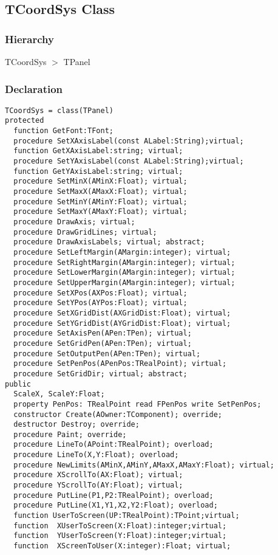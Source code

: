 \documentclass[12pt,a4paper,oneside]{report}
\begin{document}
\subsection{TCoordSys Class}\label{lmcoordsys.TCoordSys}
\subsubsection{Hierarchy}
TCoordSys {$>$} TPanel
\subsubsection{Declaration}
\begin{verbatim}
TCoordSys = class(TPanel)
protected
  function GetFont:TFont;
  procedure SetXAxisLabel(const ALabel:String);virtual;
  function GetXAxisLabel:string; virtual;
  procedure SetYAxisLabel(const ALabel:String);virtual;
  function GetYAxisLabel:string; virtual;
  procedure SetMinX(AMinX:Float); virtual;
  procedure SetMaxX(AMaxX:Float); virtual;
  procedure SetMinY(AMinY:Float); virtual;
  procedure SetMaxY(AMaxY:Float); virtual;
  procedure DrawAxis; virtual;
  procedure DrawGridLines; virtual;
  procedure DrawAxisLabels; virtual; abstract; 
  procedure SetLeftMargin(AMargin:integer); virtual;
  procedure SetRightMargin(AMargin:integer); virtual;
  procedure SetLowerMargin(AMargin:integer); virtual;
  procedure SetUpperMargin(AMargin:integer); virtual;
  procedure SetXPos(AXPos:Float); virtual;
  procedure SetYPos(AYPos:Float); virtual;
  procedure SetXGridDist(AXGridDist:Float); virtual;
  procedure SetYGridDist(AYGridDist:Float); virtual;
  procedure SetAxisPen(APen:TPen); virtual;
  procedure SetGridPen(APen:TPen); virtual;
  procedure SetOutputPen(APen:TPen); virtual;
  procedure SetPenPos(APenPos:TRealPoint); virtual;
  procedure SetGridDir; virtual; abstract;
public
  ScaleX, ScaleY:Float;
  property PenPos: TRealPoint read FPenPos write SetPenPos;
  constructor Create(AOwner:TComponent); override;
  destructor Destroy; override;
  procedure Paint; override;
  procedure LineTo(APoint:TRealPoint); overload; 
  procedure LineTo(X,Y:Float); overload;
  procedure NewLimits(AMinX,AMinY,AMaxX,AMaxY:Float); virtual;
  procedure XScrollTo(AX:Float); virtual;
  procedure YScrollTo(AY:Float); virtual;
  procedure PutLine(P1,P2:TRealPoint); overload;
  procedure PutLine(X1,Y1,X2,Y2:Float); overload;
  function UserToScreen(UP:TRealPoint):TPoint;virtual;
  function  XUserToScreen(X:Float):integer;virtual;
  function  YUserToScreen(Y:Float):integer;virtual;
  function  XScreenToUser(X:integer):Float; virtual;

\end{verbatim}
\end{document}
